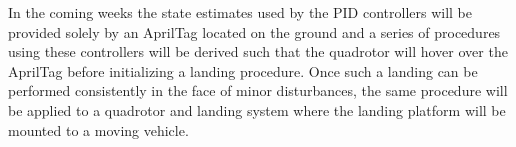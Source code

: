 \documentclass[11pt, twocolumn]{article}
\begin{document}
In the coming weeks the state estimates used by the PID controllers will be provided solely by an AprilTag located on the ground and a series of procedures using these controllers will be derived such that the quadrotor will hover over the AprilTag before initializing a landing procedure. Once such a landing can be performed consistently in the face of minor disturbances, the same procedure will be applied to a quadrotor and landing system where the landing platform will be mounted to a moving vehicle.

{}

\end{document}
